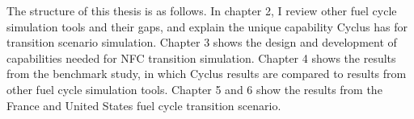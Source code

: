 The structure of this thesis is as follows. In chapter 2, I review other fuel cycle simulation
tools and their gaps, and explain the unique capability Cyclus
has for transition scenario simulation.
Chapter 3 shows the design and
development of capabilities needed for \gls{NFC} transition simulation.
Chapter 4 shows the results from the benchmark study, in which Cyclus results are compared
to results from other fuel cycle simulation tools.
Chapter 5 and 6 show the results from the France and United States fuel cycle
transition scenario.
